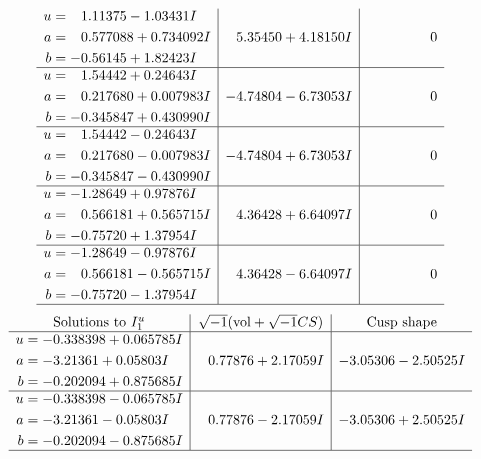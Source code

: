\documentclass[1p]{elsarticle_modified}
\theoremstyle{definition}
\newcommand{\I}{\sqrt{-1}}
\begin{document}
$$\begin{array}{c|c|c}
\begin{aligned}
u &= \phantom{-}1.11375 - 1.03431 I \\
a &= \phantom{-}0.577088 + 0.734092 I \\
b &= -0.56145 + 1.82423 I\end{aligned}
 & \phantom{-}5.35450 + 4.18150 I & \phantom{-0.000000 } 0 \\ \hline\begin{aligned}
u &= \phantom{-}1.54442 + 0.24643 I \\
a &= \phantom{-}0.217680 + 0.007983 I \\
b &= -0.345847 + 0.430990 I\end{aligned}
 & -4.74804 - 6.73053 I & \phantom{-0.000000 } 0 \\ \hline\begin{aligned}
u &= \phantom{-}1.54442 - 0.24643 I \\
a &= \phantom{-}0.217680 - 0.007983 I \\
b &= -0.345847 - 0.430990 I\end{aligned}
 & -4.74804 + 6.73053 I & \phantom{-0.000000 } 0 \\ \hline\begin{aligned}
u &= -1.28649 + 0.97876 I \\
a &= \phantom{-}0.566181 + 0.565715 I \\
b &= -0.75720 + 1.37954 I\end{aligned}
 & \phantom{-}4.36428 + 6.64097 I & \phantom{-0.000000 } 0 \\ \hline\begin{aligned}
u &= -1.28649 - 0.97876 I \\
a &= \phantom{-}0.566181 - 0.565715 I \\
b &= -0.75720 - 1.37954 I\end{aligned}
 & \phantom{-}4.36428 - 6.64097 I & \phantom{-0.000000 } 0\\
 \hline 
 \end{array}$$\newpage$$\begin{array}{c|c|c}  
\text{Solutions to }I^u_{1}& \I (\text{vol} + \sqrt{-1}CS) & \text{Cusp shape}\\
 \hline 
\begin{aligned}
u &= -0.338398 + 0.065785 I \\
a &= -3.21361 + 0.05803 I \\
b &= -0.202094 + 0.875685 I\end{aligned}
 & \phantom{-}0.77876 + 2.17059 I & -3.05306 - 2.50525 I \\ \hline\begin{aligned}
u &= -0.338398 - 0.065785 I \\
a &= -3.21361 - 0.05803 I \\
b &= -0.202094 - 0.875685 I\end{aligned}
 & \phantom{-}0.77876 - 2.17059 I & -3.05306 + 2.50525 I\\
 \hline 
 \end{array}$$\newpage\newpage\renewcommand{\arraystretch}{1}
\end{document}

